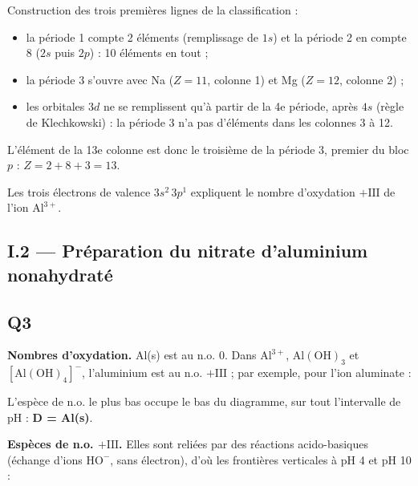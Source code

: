 \documentclass[11pt,a4paper]{article}
\providecommand{\tightlist}{\setlength{\itemsep}{0pt}\setlength{\parskip}{0pt}}
\newcommand{\equationajustee}[1]{%
  \sbox{\boiteequation}{$\displaystyle #1$}%
  \ifdim\wd\boiteequation>\linewidth
    \[\resizebox{\linewidth}{!}{\usebox{\boiteequation}}\]%
  \else
    \[#1\]%
  \fi}
\begin{document}
Construction des trois premières lignes de la classification :

\begin{itemize}
\tightlist
\item
  la période 1 compte 2 éléments (remplissage de \(1s\)) et la période 2 en compte 8 (\(2s\) puis \(2p\)) : 10 éléments en tout ;
\item
  la période 3 s'ouvre avec Na (\(Z=11\), colonne 1) et Mg (\(Z=12\), colonne 2) ;
\item
  les orbitales \(3d\) ne se remplissent qu'à partir de la 4e période, après \(4s\) (règle de Klechkowski) : la période 3 n'a pas d'éléments dans les colonnes 3 à 12.
\end{itemize}

L'élément de la 13e colonne est donc le troisième de la période 3, premier du bloc \(p\) : \(Z=2+8+3=13\).

\equationajustee{\boxed{\mathrm{Al} : 1s^2\,2s^2\,2p^6\,3s^2\,3p^1}}

Les trois électrons de valence \(3s^2\,3p^1\) expliquent le nombre d'oxydation \(+\mathrm{III}\) de l'ion \(\mathrm{Al^{3+}}\).

\hypertarget{i.2-pruxe9paration-du-nitrate-daluminium-nonahydratuxe9}{%
\subsection{I.2 --- Préparation du nitrate d'aluminium nonahydraté}\label{i.2-pruxe9paration-du-nitrate-daluminium-nonahydratuxe9}}

\hypertarget{q3}{%
\subsection{Q3}\label{q3}}

\textbf{Nombres d'oxydation.} Al(s) est au n.o. 0. Dans \(\mathrm{Al^{3+}}\), \(\mathrm{Al(OH)_3}\) et \([\mathrm{Al(OH)_4}]^-\), l'aluminium est au n.o. \(+\mathrm{III}\) ; par exemple, pour l'ion aluminate :

\equationajustee{\begin{aligned}
x+4\times(-\mathrm{II})+4\times(+\mathrm I)&=-1\\
x&=+\mathrm{III}
\end{aligned}}

L'espèce de n.o. le plus bas occupe le bas du diagramme, sur tout l'intervalle de pH : \textbf{D = Al(s)}.

\textbf{Espèces de n.o. \(+\mathrm{III}\).} Elles sont reliées par des réactions acido-basiques (échange d'ions \(\mathrm{HO^-}\), sans électron), d'où les frontières verticales à pH 4 et pH 10 :
\end{document}
